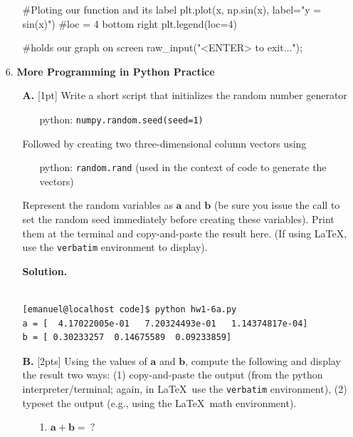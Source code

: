 \documentclass[10pt]{article}
\begin{document}
\begin{enumerate}
\begin{itemize}
\begin{python}[caption={ {\tt plot-sin.py} script}, label=Sine Function for x from 0.0 to 10.0]
#Ploting our function and its label
plt.plot(x, np.sin(x), label="y = sin(x)")
#loc = 4 bottom right
plt.legend(loc=4)

#holds our graph on screen
raw_input("\nPress <ENTER> to exit...");


\end{python}

\end{itemize}

 

\newpage
\item[6.] 
{\bf More Programming in Python Practice}

\begin{itemize}
\item[{\bf A.}]  [1pt]
Write a short script that initializes the random number generator
\begin{itemize}
\item[] python: {\tt numpy.random.seed(seed=1)}
\end{itemize}
Followed by creating two three-dimensional column vectors using
\begin{itemize}
\item[] python: {\tt random.rand} (used in the context of code to generate the vectors)
\end{itemize}
Represent the random variables as $\mathbf{a}$ and $\mathbf{b}$ (be sure you issue the call to set the random seed immediately before creating these variables).  Print them at the terminal and copy-and-paste the result here. (If using \LaTeX, use the {\tt verbatim} environment to display).

{\bf Solution.}

\begin{verbatim}

[emanuel@localhost code]$ python hw1-6a.py 
a = [  4.17022005e-01   7.20324493e-01   1.14374817e-04]
b = [ 0.30233257  0.14675589  0.09233859]

\end{verbatim}

\item[{\bf B.}]  [2pts]
Using the values of $\mathbf{a}$ and $\mathbf{b}$, compute the following and display the result two ways: (1) copy-and-paste the output (from the python interpreter/terminal; again, in \LaTeX~use the {\tt verbatim} environment), (2) typeset the output (e.g., using the \LaTeX~math environment).
\begin{enumerate}
\item[1.] $\mathbf{a} + \mathbf{b} = ~?$


\end{enumerate}
\end{itemize}
\end{enumerate}
\end{document}

